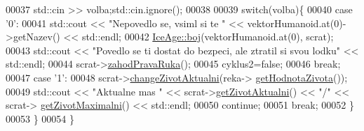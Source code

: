 \begin{DoxyCode}
00037         std::cin >> volba;std::cin.ignore();
00038 
00039         \textcolor{keywordflow}{switch}(volba)\{
00040             \textcolor{keywordflow}{case} \textcolor{charliteral}{'0'}:
00041                     std::cout << \textcolor{stringliteral}{"Nepovedlo se, vsiml si te "} << vektorHumanoid.at(0)->getNazev() << 
      std::endl;
00042                     \hyperlink{namespaceIceAge_a2c6b97286bcd54e3ecf2fdc335460e90}{IceAge::boj}(vektorHumanoid.at(0), scrat);
00043                     std::cout << \textcolor{stringliteral}{"Povedlo se ti dostat do bezpeci, ale ztratil si svou lodku"} << std::endl;
00044                     scrat->\hyperlink{classIceAge_1_1ObleceneVybaveniVeverky_ac24580a8bfcf97220c1967f58111c8f1}{zahodPravaRuka}();
00045                     cyklus2=\textcolor{keyword}{false};
00046                 \textcolor{keywordflow}{break};
00047             \textcolor{keywordflow}{case} \textcolor{charliteral}{'1'}:
00048                 scrat->\hyperlink{classIceAge_1_1Zivot_a980dc5a5af6d14c23ecca025e3ec7485}{changeZivotAktualni}(reka->
      \hyperlink{classIceAge_1_1Reka_acc4d9a4ef69da03eed8762e16a33b49f}{getHodnotaZivota}());
00049                 std::cout << \textcolor{stringliteral}{"Aktualne mas "} << scrat->\hyperlink{classIceAge_1_1Zivot_ae4e3a167722a80ccace3985f183ddd8d}{getZivotAktualni}() << \textcolor{stringliteral}{"/"} << scrat->
      \hyperlink{classIceAge_1_1Zivot_a75a65879dd6ddc0bc3e402ac6f613813}{getZivotMaximalni}() << std::endl;
00050                 \textcolor{keywordflow}{continue};
00051                 \textcolor{keywordflow}{break};
00052         \}
00053     \}
00054 \}
\end{DoxyCode}

